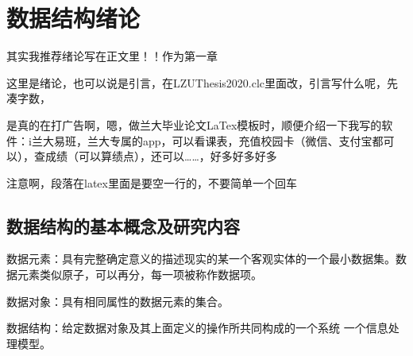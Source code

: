 \documentclass[AutoFakeBold]{LZUThesis2007}
\begin{document}
\tableofcontents


\mainmatter

\chapter{数据结构绪论}

其实我推荐绪论写在正文里！！作为第一章

    这里是绪论，也可以说是引言，在LZUThesis2020.clc里面改，引言写什么呢，先凑字数，

    是真的在打广告啊，嗯，做兰大毕业论文LaTex模板时，顺便介绍一下我写的软件：i兰大易班，兰大专属的app，可以看课表，充值校园卡（微信、支付宝都可以），查成绩（可以算绩点），还可以……，好多好多好多

    注意啊，段落在latex里面是要空一行的，不要简单一个回车

    \section{数据结构的基本概念及研究内容}

	数据元素：具有完整确定意义的描述现实的某一个客观实体的一个最小数据集。数据元素类似原子，可以再分，每一项被称作数据项。

	数据对象：具有相同属性的数据元素的集合。

	数据结构：给定数据对象及其上面定义的操作所共同构成的一个系统 一个信息处理模型。
\end{document}
